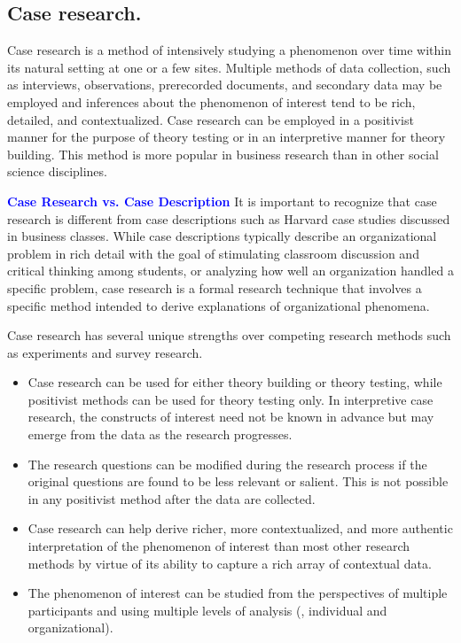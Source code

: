\subsection{Case research.} Case research is a method of intensively studying a phenomenon over time within its natural setting at one or a few sites. Multiple methods of data collection, such as interviews, observations, prerecorded documents, and secondary data may be employed and inferences about the phenomenon of interest tend to be rich, detailed, and contextualized. Case research can be employed in a positivist manner for the purpose of theory testing or in an interpretive manner for theory building. This method is more popular in business research than in other social science disciplines.

\begin{tcolorbox}[colback=blue!5!white,colframe=blue!75!black]
	\textcolor{blue}{\textbf{Case Research vs. Case Description}}
	\tcblower
	It is important to recognize that case research is different from case descriptions such as Harvard case studies discussed in business classes. While case descriptions typically describe an organizational problem in rich detail with the goal of stimulating classroom discussion and critical thinking among students, or analyzing how well an organization handled a specific problem, case research is a formal research technique that involves a specific method intended to derive explanations of organizational phenomena.
\end{tcolorbox}

Case research has several unique strengths over competing research methods such as experiments and survey research. 

\begin{itemize}
	\item Case research can be used for either theory building or theory testing, while positivist methods can be used for theory testing only. In interpretive case research, the constructs of interest need not be known in advance but may emerge from the data as the research progresses.
	
	\item The research questions can be modified during the research process if the original questions are found to be less relevant or salient. This is not possible in any positivist method after the data are collected.
	
	\item Case research can help derive richer, more contextualized, and more authentic interpretation of the phenomenon of interest than most other research methods by virtue of its ability to capture a rich array of contextual data.
	
	\item The phenomenon of interest can be studied from the perspectives of multiple participants and using multiple levels of analysis (\eg, individual and organizational).
\end{itemize}

